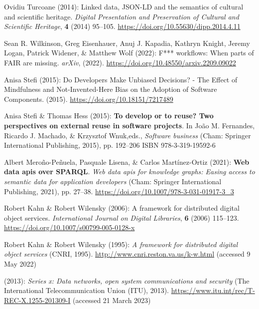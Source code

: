 \begin{thebibliography}{9}
Ovidiu Turcoane (2014): Linked data, {JSON-LD} and the semantics of
cultural and scientific heritage. \emph{Digital Presentation and
Preservation of Cultural and Scientific Heritage}, \textbf{4} (2014)
95--105.
\url{https://doi.org/10.55630/dipp.2014.4.11}

Sean R. Wilkinson, Greg Eisenhauer, Anuj J. Kapadia, Kathryn Knight,
Jeremy Logan, Patrick Widener, \& Matthew Wolf (2022): F*** workflows:
When parts of {FAIR} are missing. \emph{arXiv}, (2022).
\url{https://doi.org/10.48550/arxiv.2209.09022}

Anisa Stefi (2015): Do {Developers Make Unbiased Decisions}? - {The
Effect} of {Mindfulness} and {Not-Invented-Here Bias} on the {Adoption}
of {Software Components}. (2015).
\url{https://doi.org/10.18151/7217489}

Anisa Stefi \& Thomas Hess (2015): \textbf{To develop or to reuse? {Two}
perspectives on external reuse in software projects}. In João M.
Fernandes, Ricardo J. Machado, \& Krzysztof Wnuk,eds., \emph{Software
business} ({Cham}: {Springer International Publishing}, 2015), pp.
192--206 ISBN 978-3-319-19592-6

Albert Meroño-Peñuela, Pasquale Lisena, \& Carlos Martínez-Ortiz (2021):
\textbf{Web data apis over {SPARQL}}. \emph{Web data apis for knowledge
graphs: {Easing} access to semantic data for application developers}
({Cham}: {Springer International Publishing}, 2021), pp. 27--38.
\url{https://doi.org/10.1007/978-3-031-01917-3_3}

Robert Kahn \& Robert Wilensky (2006): A framework for distributed
digital object services. \emph{International Journal on Digital
Libraries}, \textbf{6} (2006) 115--123.
\url{https://doi.org/10.1007/s00799-005-0128-x}

Robert Kahn \& Robert Wilensky (1995): \emph{A framework for distributed
digital object services} ({CNRI}, 1995).
\url{http://www.cnri.reston.va.us/k-w.html} (accessed 9 May 2022)

(2013): \emph{Series x: Data networks, open system communications and
security} ({The International Telecommunication Union (ITU)}, 2013).
\url{https://www.itu.int/rec/T-REC-X.1255-201309-I} (accessed 21 March
2023)


\end{thebibliography}
